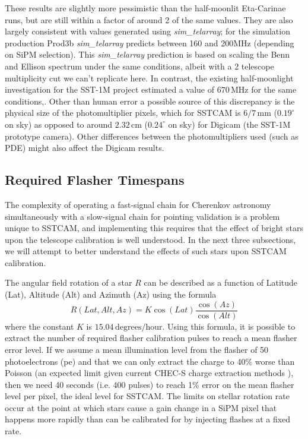 These results are slightly more pessimistic than the half-moonlit Eta-Carinae runs, but are still within a factor of around 2 of the same values. They are also largely consistent with values generated using \textit{sim\_telarray}; for the simulation production Prod3b \textit{sim\_telarray} predicts between 160 and 200MHz (depending on SiPM selection). This \textit{sim\_telarray} prediction is based on scaling the Benn and Ellison spectrum under the same conditions, albeit with a 2 telescope multiplicity cut we can't replicate here. In contrast, the existing half-moonlight investigation for the SST-1M project \cite{1mcalib} estimated a value of $\mathrm{670\,MHz}$ for the same conditions,. Other than human error a possible source of this discrepancy is the physical size of the photomultiplier pixels, which for SSTCAM is $\mathrm{6/7\,mm}$ ($0.19^{\circ}$ on sky) as opposed to around $\mathrm{2.32\,cm}$ ($0.24^{\circ}$ on sky) for Digicam (the SST-1M prototype camera). Other differences between the photomultipliers used (such as PDE) might also affect the Digicam results. 

\subsection{Required Flasher Timespans}

The complexity of operating a fast-signal chain for Cherenkov astronomy simultaneously with a slow-signal chain for pointing validation is a problem unique to SSTCAM, and implementing this requires that the effect of bright stars upon the telescope calibration is well understood. In the next three subsections, we will attempt to better understand the effects of such stars upon SSTCAM calibration.

The angular field rotation of a star $R$ can be described as a function of Latitude (Lat), Altitude (Alt) and Azimuth (Az) using the formula
\begin{equation}
    R(Lat,Alt,Az)=K\cos(Lat)\frac{\cos(Az)}{\cos(Alt)}
    \label{eq:rot}
\end{equation}
where the constant $K$ is $\mathrm{15.04\,degrees/hour}$. Using this formula, it is possible to extract the number of required flasher calibration pulses to reach a mean flasher error level. If we assume a mean illumination level from the flasher of 50 photoelectrons (pe) and that we can only extract the charge to 40\% worse than Poisson (an expected limit given current CHEC-S charge extraction methods \cite{jasonthesis}), then we need 40 seconds (i.e. 400 pulses) to reach 1\% error on the mean flasher level per pixel, the ideal level for SSTCAM. The limits on stellar rotation rate occur at the point at which stars cause a gain change in a SiPM pixel that happens more rapidly than can be calibrated for by injecting flashes at a fixed rate.

